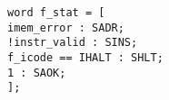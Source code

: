 \documentclass{article}
\begin{document}
\texttt{word f\_stat = [\\
\hspace*{17mm} imem\_error : SADR; \\
\hspace*{17mm} !instr\_valid : SINS; \\
\hspace*{17mm} f\_icode == IHALT : SHLT; \\
\hspace*{17mm} 1 : SAOK; \\
\hspace*{5mm}];}
\end{document}
